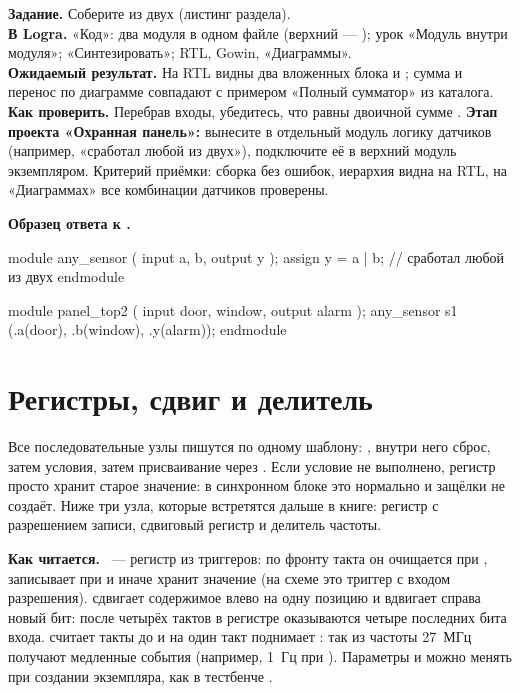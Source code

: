\begin{diybox}
\textbf{Задание.} Соберите  из двух  (листинг раздела).\\
\textbf{В Logra.} «Код»: два модуля в одном файле (верхний --- ); урок «Модуль внутри модуля»; «Синтезировать»; RTL, Gowin, «Диаграммы».\\
\textbf{Ожидаемый результат.} На RTL видны два вложенных блока  и ; сумма и перенос по диаграмме совпадают с примером «Полный сумматор» из каталога.\\
\textbf{Как проверить.} Перебрав входы, убедитесь, что  равны двоичной сумме .  \textbf{Этап проекта «Охранная панель»:} вынесите в отдельный модуль логику датчиков (например, «сработал любой из двух»), подключите её в верхний модуль экземпляром. Критерий приёмки: сборка без ошибок, иерархия видна на RTL, на «Диаграммах» все комбинации датчиков проверены.
\end{diybox}

\textbf{Образец ответа к .}\par\nopagebreak
\begin{vcode}
module any_sensor (
    input  a, b,
    output y
);
    assign y = a | b;                   // сработал любой из двух
endmodule

module panel_top2 (
    input  door, window,
    output alarm
);
    any_sensor s1 (.a(door), .b(window), .y(alarm));
endmodule
\end{vcode}


\section{Регистры, сдвиг и делитель}
\label{sec:v-regs}

Все последовательные узлы пишутся по одному шаблону:
, внутри него сброс, затем условия, затем
присваивание через \code{<=}. Если условие не выполнено, регистр просто хранит
старое значение: в синхронном блоке это нормально и защёлки не создаёт. Ниже
три узла, которые встретятся дальше в книге: регистр с разрешением записи,
сдвиговый регистр и делитель частоты.


\textbf{Как читается.} ~--- регистр из  триггеров: по
фронту такта он очищается при , записывает  при  и
иначе хранит значение (на схеме это триггер с входом разрешения).
 сдвигает содержимое влево на одну позицию и вдвигает справа
новый бит: после четырёх тактов в регистре оказываются четыре последних бита
входа.  считает такты до  и на один такт поднимает
: так из частоты 27~МГц получают медленные события (например, 1~Гц
при ). Параметры  и  можно менять при
создании экземпляра, как в тестбенче .

